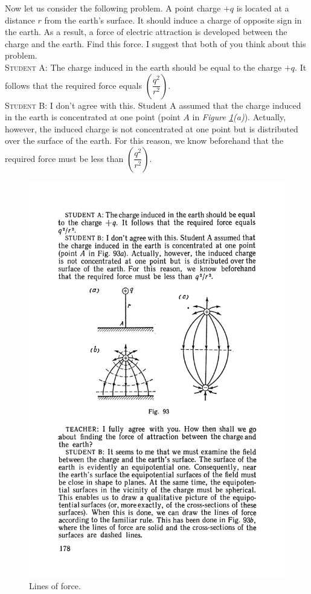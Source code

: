 \documentclass[a4paper,sfsidenotes]{tufte-book}
\begin{document}
Now let us consider the following problem. A point charge $+q$ is located at a distance $r$ from the earth's surface. It should induce a charge of opposite sign in the earth. As a result, a force of electric attraction is developed between the charge and the earth. Find this force. I suggest that both of you think about this problem.
\\
\textsc{Student A:} The charge induced in the earth should be equal to the charge $+q$. It follows that the required force equals $\left( \dfrac{q^{2}}{r^{2}} \right)$.
\\
\textsc{Student B:} I don't agree with this. Student A assumed that the charge induced in the earth is concentrated at one point (point $A$ in \emph{Figure \ref{fig-93}(a)}). Actually, however, the induced charge is not concentrated at one point but is distributed over the surface of the earth. For this reason, we know beforehand that the required force must be less than $\left( \dfrac{q^{2}}{r^{2}} \right)$.
\begin{figure}%
\centering
\includegraphics[width=0.8\linewidth]{fig-093a}
\caption{Lines of force.}
\label{fig-93}
\end{figure}
\end{document}
